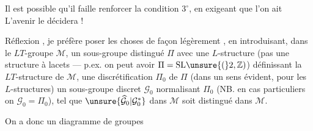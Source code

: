 
Il est possible qu'il faille renforcer la condition \(3^\circ\), en exigeant que l'on ait
L'avenir le décidera !


Réflexion , je préfère poser les choses de façon légèrement , en introduisant, dans le \(LT\)-groupe  \(\mathcal{M}\), un sous-groupe  distingué \(\Pi\) avec une \(L\)-structure (pas  une structure à lacets --- p.ex. on peut avoir \(\Pi=\mathrm{SL}\unsure{(}2,\mathbb{Z})\)) définissant la \(LT\)-structure de \(\mathcal{M}\), une discrétification \(\Pi_0\) de \(\Pi\) (dans un sens évident, pour les \(L\)-structures) un sous-groupe discret \(\mathcal{G}_0\)  normalisant \(\Pi_0\) (NB. en cas particuliers  on \(\mathcal{G}_0=\Pi_0\)), tel que  \(\unsure{\widehat{\mathcal{G}}_0|\mathcal{G}_0^{*}}\)  dans \(\mathcal{M}\) soit distingué dans \(\mathcal{M}\).

On a donc un diagramme de groupes

